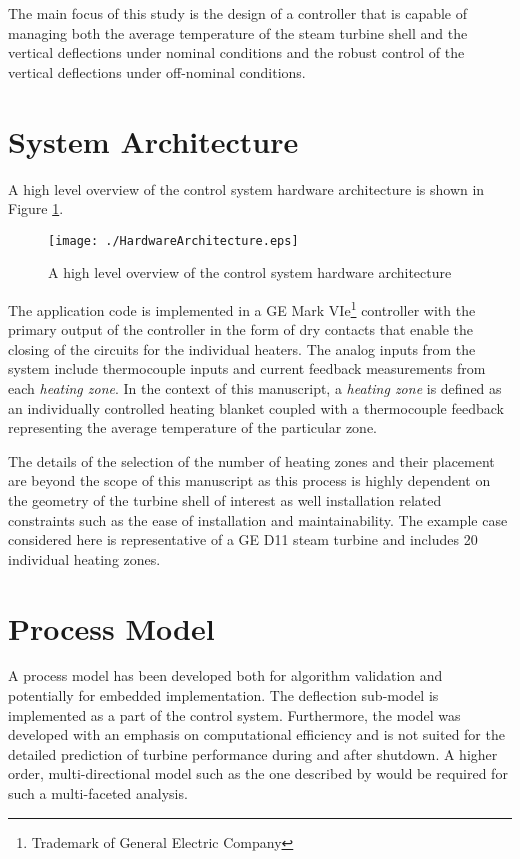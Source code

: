 \documentclass[a4paper, 10pt, conference]{ieeeconf}      %
\begin{document}
The main focus of this study is the design of a controller that is capable of managing both the average temperature of the steam turbine shell and the vertical deflections under nominal conditions and the robust control of the vertical deflections under off-nominal conditions.

\section{System Architecture\label{sec:System-Architecture}}
A high level overview of the control system hardware architecture is shown in Figure \ref{fig:Hardware-Architecture}. 
\begin{figure}
\centering{}\texttt{[image: ./HardwareArchitecture.eps]}
\caption{\label{fig:Hardware-Architecture}A high level overview of the control system hardware architecture}
\end{figure}
The application code is implemented in a GE Mark VIe\footnote{Trademark of General Electric Company} controller with the primary output of the controller in the form of dry contacts that enable the closing of the circuits for the individual heaters. The analog inputs from the system include thermocouple inputs and current feedback measurements from each \emph{heating zone}. In the context of this manuscript, a \emph{heating zone} is defined as an individually controlled heating blanket coupled with a thermocouple feedback representing the average temperature of the particular zone.

The details of the selection of the number of heating zones and their placement are beyond the scope of this manuscript as this process is highly dependent on the geometry of the turbine shell of interest as well installation related constraints such as the ease of installation and maintainability. The example case considered here is representative of a GE D11 steam turbine and includes 20 individual heating zones. 

\section{Process Model\label{sec:Process-Model}}

A process model has been developed both for algorithm validation and potentially for embedded implementation. The deflection sub-model is implemented as a part of the control system. Furthermore, the model was developed with an emphasis on computational efficiency and is not suited for the detailed prediction of turbine performance during and after shutdown. A higher order, multi-directional model such as the one described by \cite{Spelling2012a} would be required for such a multi-faceted analysis. 
\end{document}
